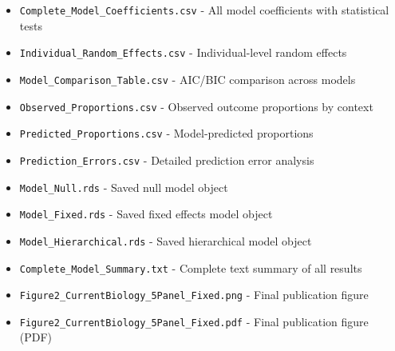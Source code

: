\documentclass[11pt,a4paper]{article}
\begin{document}
\begin{itemize}
\item \texttt{Complete\_Model\_Coefficients.csv} - All model coefficients with statistical tests
\item \texttt{Individual\_Random\_Effects.csv} - Individual-level random effects
\item \texttt{Model\_Comparison\_Table.csv} - AIC/BIC comparison across models
\item \texttt{Observed\_Proportions.csv} - Observed outcome proportions by context
\item \texttt{Predicted\_Proportions.csv} - Model-predicted proportions
\item \texttt{Prediction\_Errors.csv} - Detailed prediction error analysis
\item \texttt{Model\_Null.rds} - Saved null model object
\item \texttt{Model\_Fixed.rds} - Saved fixed effects model object
\item \texttt{Model\_Hierarchical.rds} - Saved hierarchical model object
\item \texttt{Complete\_Model\_Summary.txt} - Complete text summary of all results
\item \texttt{Figure2\_CurrentBiology\_5Panel\_Fixed.png} - Final publication figure
\item \texttt{Figure2\_CurrentBiology\_5Panel\_Fixed.pdf} - Final publication figure (PDF)
\end{itemize}
\end{document}
